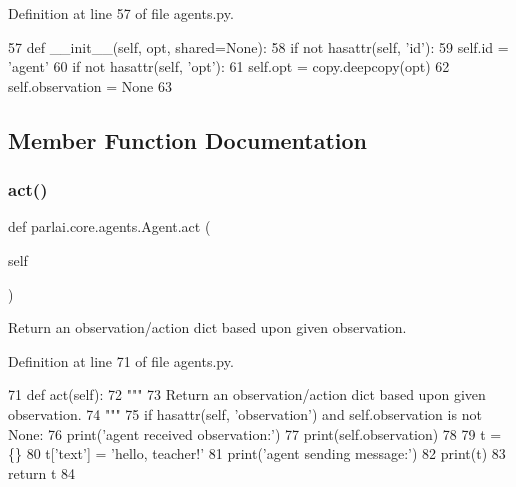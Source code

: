 Definition at line 57 of file agents.\+py.


\begin{DoxyCode}
57     \textcolor{keyword}{def }\_\_init\_\_(self, opt, shared=None):
58         \textcolor{keywordflow}{if} \textcolor{keywordflow}{not} hasattr(self, \textcolor{stringliteral}{'id'}):
59             self.id = \textcolor{stringliteral}{'agent'}
60         \textcolor{keywordflow}{if} \textcolor{keywordflow}{not} hasattr(self, \textcolor{stringliteral}{'opt'}):
61             self.opt = copy.deepcopy(opt)
62         self.observation = \textcolor{keywordtype}{None}
63 
\end{DoxyCode}


\subsection{Member Function Documentation}
\mbox{\label{classparlai_1_1core_1_1agents_1_1Agent_a6a8abe0a98dd59bc39c9f12b163072db}} 
\subsubsection{\texorpdfstring{act()}{act()}}
{\footnotesize\ttfamily def parlai.\+core.\+agents.\+Agent.\+act (\begin{DoxyParamCaption}\item[{}]{self }\end{DoxyParamCaption})}

\begin{DoxyVerb}Return an observation/action dict based upon given observation.
\end{DoxyVerb}
 

Definition at line 71 of file agents.\+py.


\begin{DoxyCode}
71     \textcolor{keyword}{def }act(self):
72         \textcolor{stringliteral}{"""}
73 \textcolor{stringliteral}{        Return an observation/action dict based upon given observation.}
74 \textcolor{stringliteral}{        """}
75         \textcolor{keywordflow}{if} hasattr(self, \textcolor{stringliteral}{'observation'}) \textcolor{keywordflow}{and} self.observation \textcolor{keywordflow}{is} \textcolor{keywordflow}{not} \textcolor{keywordtype}{None}:
76             print(\textcolor{stringliteral}{'agent received observation:'})
77             print(self.observation)
78 
79         t = \{\}
80         t[\textcolor{stringliteral}{'text'}] = \textcolor{stringliteral}{'hello, teacher!'}
81         print(\textcolor{stringliteral}{'agent sending message:'})
82         print(t)
83         \textcolor{keywordflow}{return} t
84 
\end{DoxyCode}
\mbox{\label{classparlai_1_1core_1_1agents_1_1Agent_a2525db5bdd19a3bf5b0669bfa158f9ff}} 
